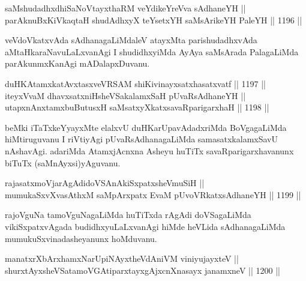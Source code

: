 \begin{shl}
saMshudadhxdhiSaNoV\s tayxthaRM veYdikeYreVva sAdhaneYH || \\
parAknuBxKiVkaqtaH shudAdhxyX teYsetxYH saMsArikeYH PaleYH ||  1196 ||  
\end{shl}

\begin{artha}
veVdoVkatxvAda sAdhanagaLiMdaleV atayxMta parishudadhxvAda aMtaHkaraNavuLaLxvanAgi I shudidhxyiMda AyAya saMsArada PalagaLiMda parAkunmxKanAgi mADalapxDuvanu.
\end{artha}


\begin{shl}
duHKAtamxkatAvxtasxveVRSAM shiKivinayxsatxhasatxvatf ||  1197 ||  \\
iteyxVvaM dhavxsatxniHsheVSakalamxSaH pUvaRsAdhaneYH || \\
utapxnAnxtamxbuButusxH saMsatxyXkatxsavaRparigarxhaH ||  1198 ||  
\end{shl}

\begin{artha}
beMki iTaTxkeYyayxMte elalxvU duHKarUpavAdadxriMda BoVgagaLiMda hiMtiruguvanu I riVtiyAgi pUvaRsAdhanagaLiMda samasatxkalamxSavU nAshavAgi. adariMda AtamxjAcnxna Asheyu huTiTx savaRparigarxhavanunx biTuTx (saMnAyxsi)yAguvanu.
\end{artha}


\begin{shl}
rajasatxmoVjarAgAdidoVSAnAkiSxpatxsheVmuSiH || \\
mumukaSxvXvasAthxM saMpArxpatx EvaM pUvoVRkatxsAdhaneYH ||  1199 ||  
\end{shl}

\begin{artha}
rajoVguNa tamoVguNagaLiMda huTiTxda rAgAdi doVSagaLiMda vikiSxpatxvAgada budidhxyuLaLxvanAgi hiMde heVLida sAdhanagaLiMda mumukuSxvinadasheyanunx hoMduvanu.
\end{artha}


\begin{shl}
manatxrXbArxhamxNarUpiNAyx\s theVdAniVM viniyujayxteV || \\
shurxtAyx\s sheVSatamoVGAtiparxtayxgAjxcnXnasayx janamxneV ||  1200 ||  
\end{shl}

